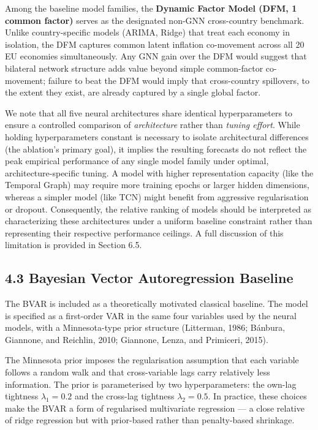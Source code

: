 \documentclass[
]{article}
\newcounter{none} %
\begin{document}
Among the baseline model families, the \textbf{Dynamic Factor Model (DFM, 1 common factor)} serves as the designated non-GNN cross-country benchmark. Unlike country-specific models (ARIMA, Ridge) that treat each economy in isolation, the DFM captures common latent inflation co-movement across all 20 EU economies simultaneously. Any GNN gain over the DFM would suggest that bilateral network structure adds value beyond simple common-factor co-movement; failure to beat the DFM would imply that cross-country spillovers, to the extent they exist, are already captured by a single global factor.

We note that all five neural architectures share identical hyperparameters to ensure a controlled comparison of \emph{architecture} rather than \emph{tuning effort}. While holding hyperparameters constant is necessary to isolate architectural differences (the ablation's primary goal), it implies the resulting forecasts do not reflect the peak empirical performance of any single model family under optimal, architecture-specific tuning. A model with higher representation capacity (like the Temporal Graph) may require more training epochs or larger hidden dimensions, whereas a simpler model (like TCN) might benefit from aggressive regularisation or dropout. Consequently, the relative ranking of models should be interpreted as characterizing these architectures under a uniform baseline constraint rather than representing their respective performance ceilings. A full discussion of this limitation is provided in Section 6.5.

\subsection{4.3 Bayesian Vector Autoregression Baseline}\label{bvar-baseline}

The BVAR is included as a theoretically motivated classical baseline. The model is specified as a first-order VAR in the same four variables used by the neural models, with a Minnesota-type prior structure (Litterman, 1986; B\'{a}nbura, Giannone, and Reichlin, 2010; Giannone, Lenza, and Primiceri, 2015).

The Minnesota prior imposes the regularisation assumption that each variable follows a random walk and that cross-variable lags carry relatively less information. The prior is parameterised by two hyperparameters: the own-lag tightness $\lambda_1 = 0.2$ and the cross-lag tightness $\lambda_2 = 0.5$. In practice, these choices make the BVAR a form of regularised multivariate regression --- a close relative of ridge regression but with prior-based rather than penalty-based shrinkage.
\end{document}
